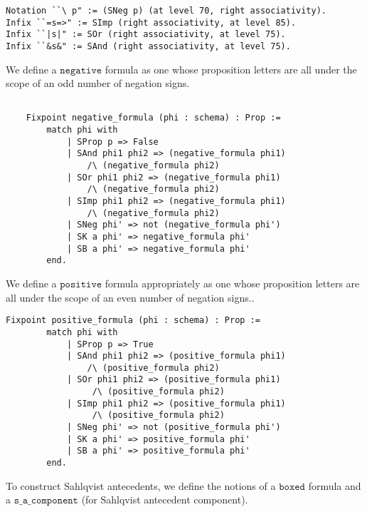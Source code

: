 \begin{tcolorbox}
	\begin{lstlisting}[language=Coq]
Notation ``\ p" := (SNeg p) (at level 70, right associativity).
Infix ``=s=>" := SImp (right associativity, at level 85).
Infix ``|s|" := SOr (right associativity, at level 75).
Infix ``&s&" := SAnd (right associativity, at level 75).
	\end{lstlisting}
\end{tcolorbox}
We define a $\mathtt{negative}$ formula as one whose proposition letters are all under the scope of an odd number of negation signs.

\begin{tcolorbox}
	\begin{lstlisting}[language=Coq]
	
	Fixpoint negative_formula (phi : schema) : Prop :=
		match phi with
			| SProp p => False
			| SAnd phi1 phi2 => (negative_formula phi1) 
				/\ (negative_formula phi2)
			| SOr phi1 phi2 => (negative_formula phi1) 
				/\ (negative_formula phi2)
			| SImp phi1 phi2 => (negative_formula phi1) 
				/\ (negative_formula phi2)
			| SNeg phi' => not (negative_formula phi')
			| SK a phi' => negative_formula phi'
			| SB a phi' => negative_formula phi'
		end.
	\end{lstlisting}	
	
\end{tcolorbox}

We define a $\mathtt{positive}$ formula appropriately as one whose proposition letters are all under the scope of an even number of negation signs..

\begin{tcolorbox}
	\begin{lstlisting}[language=Coq]
	Fixpoint positive_formula (phi : schema) : Prop :=
		match phi with
			| SProp p => True
			| SAnd phi1 phi2 => (positive_formula phi1) 
				/\ (positive_formula phi2)
			| SOr phi1 phi2 => (positive_formula phi1)
				 /\ (positive_formula phi2)
			| SImp phi1 phi2 => (positive_formula phi1)
				 /\ (positive_formula phi2)
			| SNeg phi' => not (positive_formula phi')
			| SK a phi' => positive_formula phi'
			| SB a phi' => positive_formula phi'
		end.
	\end{lstlisting}	
	
\end{tcolorbox}

To construct Sahlqvist antecedents, we define the notions of a $\mathtt{boxed}$ formula and a $\mathtt{s\_a\_component}$ (for Sahlqvist antecedent component).

